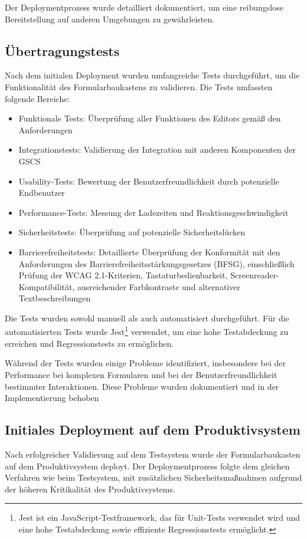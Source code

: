\documentclass[a4paper,11pt]{article}
\begin{document}
\noindent Der Deploymentprozess wurde detailliert dokumentiert, um eine reibungslose Bereitstellung auf anderen Umgebungen zu gewährleisten.

\subsection{Übertragungstests}
Nach dem initialen Deployment wurden umfangreiche Tests durchgeführt, um die Funktionalität des Formularbaukastens zu validieren. Die Tests umfassten folgende Bereiche:
\begin{itemize}
  \item Funktionale Tests: Überprüfung aller Funktionen des Editors gemäß den Anforderungen
  \item Integrationstests: Validierung der Integration mit anderen Komponenten der GSCS
  \item Usability-Tests: Bewertung der Benutzerfreundlichkeit durch potenzielle Endbenutzer
  \item Performance-Tests: Messung der Ladezeiten und Reaktionsgeschwindigkeit
  \item Sicherheitstests: Überprüfung auf potenzielle Sicherheitslücken
  \item Barrierefreiheitstests: Detaillierte Überprüfung der Konformität mit den Anforderungen des Barrierefreiheitsstärkungsgesetzes (BFSG), einschließlich Prüfung der WCAG 2.1-Kriterien, Tastaturbedienbarkeit, Screenreader-Kompatibilität, ausreichender Farbkontraste und alternativer Textbeschreibungen
\end{itemize}

\noindent Die Tests wurden sowohl manuell als auch automatisiert durchgeführt. Für die automatisierten Tests wurde Jest\footnote{Jest ist ein JavaScript-Testframework, das für Unit-Tests verwendet wird und eine hohe Testabdeckung sowie effiziente Regressionstests ermöglicht.} verwendet, um eine hohe Testabdeckung zu erreichen und Regressionstests zu ermöglichen.

\noindent Während der Tests wurden einige Probleme identifiziert, insbesondere bei der Performance bei komplexen Formularen und bei der Benutzerfreundlichkeit bestimmter Interaktionen. Diese Probleme wurden dokumentiert und in der Implementierung behoben

\subsection{Initiales Deployment auf dem Produktivsystem}
Nach erfolgreicher Validierung auf dem Testsystem wurde der Formularbaukasten auf dem Produktivsystem deployt. Der Deploymentprozess folgte dem gleichen Verfahren wie beim Testsystem, mit zusätzlichen Sicherheitsmaßnahmen aufgrund der höheren Kritikalität des Produktivsystems.
\end{document}
